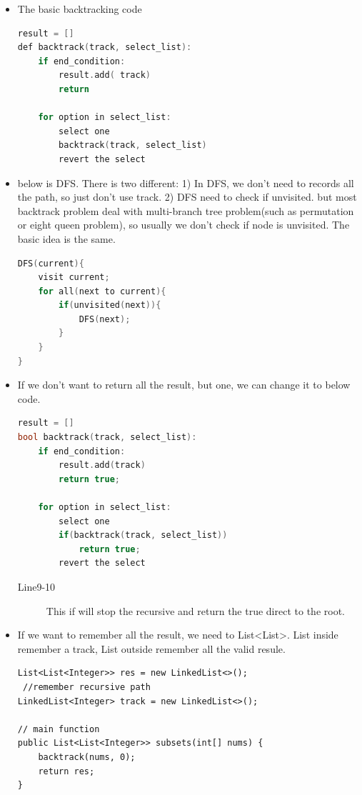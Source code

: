 \documentclass[a4paper,11pt,twoside]{book}
\begin{document}
\begin{itemize}
	
	
	
	\item The basic backtracking code
\begin{lstlisting}[frame=single, language=c++]
result = []
def backtrack(track, select_list):
	if end_condition:
		result.add( track)
		return

	for option in select_list:
		select one
		backtrack(track, select_list)
		revert the select	
\end{lstlisting}

\item below is DFS. There is two different: 1) In DFS, we don't need to records all the path, so just don't use track. 2) DFS need to check if unvisited. but most backtrack problem deal with multi-branch tree problem(such as permutation or eight queen problem), so usually we don't check if node is unvisited. The basic idea is the same. 
\begin{lstlisting}[frame=single, language=c++]
DFS(current){
	visit current;
	for all(next to current){
		if(unvisited(next)){
			DFS(next);
		}
	}
}	
\end{lstlisting} 

	\item If we don't want to return all the result, but one, we can change it to below code. 
\begin{lstlisting}[frame=single, language=c++]
result = []
bool backtrack(track, select_list):
	if end_condition:
		result.add(track)
		return true;
	
	for option in select_list:
		select one
		if(backtrack(track, select_list))
			return true;
		revert the select	
\end{lstlisting}
\begin{description}
	\item[Line9-10] This if will stop the recursive and return the true direct to the root.
\end{description}

	\item If we want to remember all the result, we need to List<List>. List inside remember a track, List outside remember all the valid resule. 

\begin{lstlisting}
List<List<Integer>> res = new LinkedList<>();
 //remember recursive path
LinkedList<Integer> track = new LinkedList<>();

// main function
public List<List<Integer>> subsets(int[] nums) {
	backtrack(nums, 0);
	return res;
}



\end{lstlisting}
\end{itemize}
\end{document}
